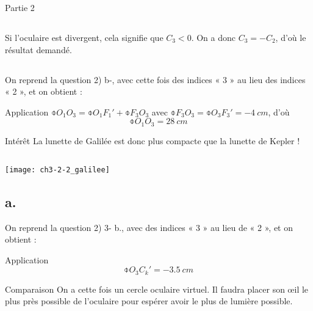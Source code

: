 \documentclass[../main/main.tex]{subfiles}
\begin{document}
\begin{center}
    \huge Partie 2
\end{center}

\subsection{}
Si l'oculaire est divergent, cela signifie que $C_3 < 0$. On a donc $C_3 = -
C_2$, d'où le résultat demandé.

\subsection{}
On reprend la question 2) b-, avec cette fois des indices « 3 » au lieu des
indices « 2 », et on obtient :

\begin{tcbraster}[raster columns=2, raster equal height=rows]
    \begin{NCexem}{Application}
        $\obar{O_1O_3} = \obar{O_1F_1'} + \obar{F_3O_3}$ avec $\obar{F_3O_3} =
        \obar{O_3F_3'} = \SI{-4}{cm}$, d'où
        \[ \boxed{\obar{O_1O_3} = \SI{+28}{cm}} \]
    \end{NCexem}
    \begin{inte}{Intérêt}
        La lunette de Galilée est donc plus compacte que la lunette de Kepler !
    \end{inte}
\end{tcbraster}
\vfill
\subsection{}

\begin{center}
    \texttt{[image: ch3-2-2\_galilee]}
\end{center}

\subsection{a.}
On reprend la question 2) 3- b., avec des indices « 3 » au lieu de « 2 », et on
obtient :
\begin{tcbraster}[raster columns=3, raster equal height=rows]
    \begin{NCexem}[raster multicolumn=1]{Application}
        \[ \boxed{\obar{O_3C_k'} = \SI{-3.5}{cm}}\]
    \end{NCexem}
    \begin{NCrema}[raster multicolumn=2]{Comparaison}
        On a cette fois un cercle oculaire virtuel. Il faudra placer son œil le plus
        près possible de l'oculaire pour espérer avoir le plus de lumière possible.
    \end{NCrema}
\end{tcbraster}
\end{document}

